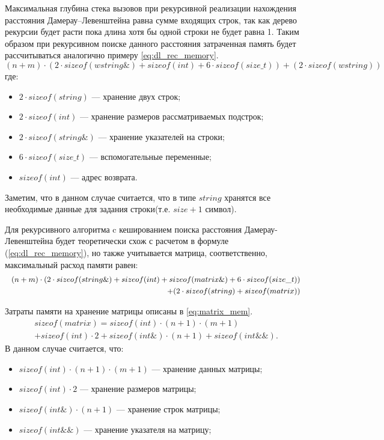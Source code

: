 Максимальная глубина стека вызовов при рекурсивной реализации нахождения расстояния Дамерау--Левенштейна равна сумме входящих строк,
так как дерево рекурсии будет расти пока длина хотя бы одной строки не будет равна 1. Таким образом при рекурсивном поиске данного расстояния затраченная память
будет рассчитываться  аналогично примеру \ref{eq:dl_rec_memory}.
\begin{equation}
	\label{eq:dl_rec_memory}
	(n + m) \cdot (2 \cdot sizeof(wstring\&) + sizeof(int) + 6 \cdot sizeof(size\_t)) +  (2 \cdot sizeof(wstring))
\end{equation}
где:
\begin{itemize}
	\item $2 \cdot sizeof(string)$ --- хранение двух строк;
	\item $2 \cdot sizeof(int)$ --- хранение размеров рассматриваемых подстрок;
	\item $2 \cdot sizeof(string\&)$ --- хранение указателей на строки;
	\item $6 \cdot sizeof(size\_t)$ --- вспомогательные переменные;
	\item $sizeof(int)$ --- адрес возврата.
\end{itemize}

Заметим, что в данном случае считается, что в типе $string$ хранятся все необходимые данные для задания строки(т.е. $size + 1$ символ).

Для рекурсивного алгоритма c кешированием поиска расстояния Дамерау-Левенштейна будет теоретически схож с расчетом в формуле (\ref{eq:dl_rec_memory}),
но также учитывается матрица, соответственно, максимальный расход памяти равен:
\begin{equation}
	\label{eq:dl_hash_memory}
    \small
	\begin{aligned}
		(n + m) \cdot (2 \cdot sizeof(string\&) + sizeof(int) + sizeof(matrix\&) + 6 \cdot sizeof(size\_t)) \\
        + (2 \cdot sizeof(string) + sizeof(matrix))
	\end{aligned}
\end{equation}

Затраты памяти на хранение матрицы описаны в  \ref{eq:matrix_mem}.
\begin{equation}
	\label{eq:matrix_mem}
    \begin{align}
	sizeof(matrix) = sizeof(int) \cdot (n+1) \cdot (m + 1)  \\
    + sizeof(int) \cdot 2 + sizeof(int\&) \cdot (n + 1) + sizeof(int\&\&).
    \end{align}
\end{equation}
В данном случае считается, что:
\begin{itemize}
	\item $sizeof(int) \cdot (n+1) \cdot (m + 1)$ --- хранение данных матрицы;
	\item $sizeof(int) \cdot 2$ --- хранение размеров матрицы;
	\item $sizeof(int\&) \cdot (n + 1)$ --- хранение строк матрицы;
	\item $sizeof(int\&\&)$ --- хранение указателя на матрицу;
\end{itemize}


